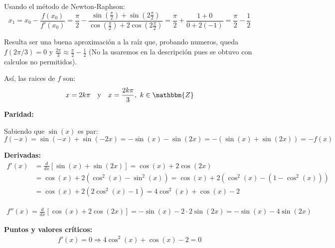 \documentclass[12pt]{article}
\begin{document}
\begin{enumerate}[\hspace{9px} a)]
        Usando el m\'etodo de Newton-Raphson:
        \begin{equation*}
            x_1 = x_0 - \frac{f(x_0)}{f'(x_0)} = \frac{\pi}{2} - \frac{\sin(\frac{\pi}{2})+\sin(2\frac{\pi}{2})}{\cos(\frac{\pi}{2})+2\cos(2\frac{\pi}{2})} = \frac{\pi}{2}+\frac{1+0}{0+2(-1)} = \frac{\pi}{2}-\frac{1}{2}
        \end{equation*}

        Resulta ser una buena aproximaci\'on a la ra\'iz que, probando numeros, queda \(f(2\pi/3) = 0\) y \(\displaystyle\frac{2\pi}{3}\approx\frac{\pi}{2}-\frac{1}{2}\) (No la usaremos en la descripci\'on pues se obtuvo con calculos no permitidos).\medskip

        As\'i, las raices de \(f\) son:
        \begin{align*}
            x = 2k\pi \quad \text{y} \quad x = \frac{2k\pi}{3}, \ k\in \mathbbm{Z}
        \end{align*}

    \textbf{Paridad: }\medskip
        
        Sabiendo que \(\sin(x)\) es par:
        \begin{equation*}
            f(-x)=\sin(-x)+\sin(-2x) = -\sin(x) - \sin(2x) = -(\sin(x)+\sin(2x)) = -f(x)
        \end{equation*}

    \textbf{Derivadas: }
        \begin{align*}
            f'(x) &= \frac{d}{dx}[\sin(x)+\sin(2x)] = \cos(x) + 2\cos(2x) \\
            &= \cos(x) + 2(\cos^2(x)-\sin^2(x)) = \cos(x) + 2(\cos^2(x)-(1-\cos^2(x))) \\
            &= \cos(x) + 2(2\cos^2(x)-1) = 4\cos^2(x)+\cos(x)-2
        \end{align*}

        \begin{align*}
            f''(x) = \frac{d}{dx}[\cos(x) + 2\cos(2x)] = -\sin(x) - 2\cdot2\sin(2x) = -\sin(x) - 4\sin(2x)
        \end{align*}

    \textbf{Puntos y valores cr\'iticos: }
        \begin{align*}
            f'(x) = 0 \Longrightarrow 4\cos^2(x)+\cos(x)-2=0
        \end{align*}


\end{enumerate}
\end{document}
